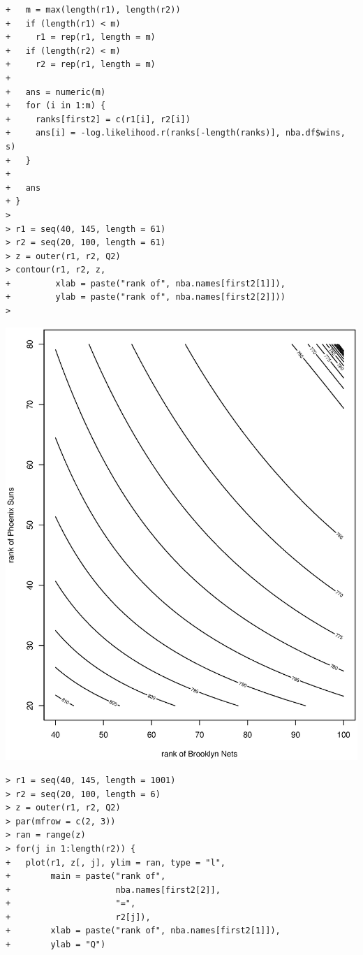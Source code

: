 \documentclass[11pt]{report}
\theoremstyle{definition}
\theoremstyle{remark}
\begin{document}
\begin{enumerate}
\begin{enumerate}
\begin{verbatim}
+   m = max(length(r1), length(r2))
+   if (length(r1) < m)
+     r1 = rep(r1, length = m)
+   if (length(r2) < m)
+     r2 = rep(r1, length = m)
+   
+   ans = numeric(m)
+   for (i in 1:m) {
+     ranks[first2] = c(r1[i], r2[i])
+     ans[i] = -log.likelihood.r(ranks[-length(ranks)], nba.df$wins, s)
+   }
+   
+   ans
+ }
> 
> r1 = seq(40, 145, length = 61)
> r2 = seq(20, 100, length = 61)
> z = outer(r1, r2, Q2)
> contour(r1, r2, z,
+         xlab = paste("rank of", nba.names[first2[1]]),
+         ylab = paste("rank of", nba.names[first2[2]]))
> \end{verbatim}
    \includegraphics[width=\textwidth]{a2_contour.eps}
    \begin{verbatim}> r1 = seq(40, 145, length = 1001)
> r2 = seq(20, 100, length = 6)
> z = outer(r1, r2, Q2)
> par(mfrow = c(2, 3))
> ran = range(z)
> for(j in 1:length(r2)) {
+   plot(r1, z[, j], ylim = ran, type = "l",
+        main = paste("rank of", 
+                     nba.names[first2[2]], 
+                     "=", 
+                     r2[j]),
+        xlab = paste("rank of", nba.names[first2[1]]),
+        ylab = "Q")

\end{verbatim}
\end{enumerate}
\end{enumerate}
\end{document}
